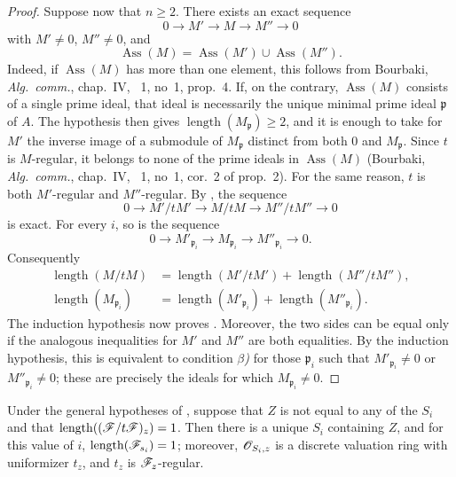 \begin{proof}
Suppose now that $n\geqslant 2$.
There exists an exact sequence
\[
0\longrightarrow M'\longrightarrow M\longrightarrow M''\longrightarrow 0
\]
with $M'\neq 0$, $M''\neq 0$, and
\[
\operatorname{Ass}(M)=\operatorname{Ass}(M')\cup\operatorname{Ass}(M'').
\]
Indeed, if $\operatorname{Ass}(M)$ has more than one element, this follows from Bourbaki, \emph{Alg.\ comm.}, chap.~IV, \textsection~1, no~1, prop.~4.
If, on the contrary, $\operatorname{Ass}(M)$ consists of a single prime ideal, that ideal is necessarily the unique minimal prime ideal $\mathfrak p$ of $A$.
The hypothesis then gives $\operatorname{length}(M_{\mathfrak p})\geqslant 2$, and it is enough to take for $M'$ the inverse image of a submodule of $M_{\mathfrak p}$ distinct from both $0$ and $M_{\mathfrak p}$.
Since $t$ is $M$-regular, it belongs to none of the prime ideals in $\operatorname{Ass}(M)$ (Bourbaki, \emph{Alg.\ comm.}, chap.~IV, \textsection~1, no~1, cor.~2 of prop.~2).
For the same reason, $t$ is both $M'$-regular and $M''$-regular.
By , the sequence
\[
0\longrightarrow M'/tM'
 \longrightarrow M/tM
 \longrightarrow M''/tM''
 \longrightarrow 0
\]
is exact.
For every $i$, so is the sequence
\[
0\longrightarrow M'_{\mathfrak p_i}
 \longrightarrow M_{\mathfrak p_i}
 \longrightarrow M''_{\mathfrak p_i}
 \longrightarrow 0.
\]
Consequently
\[
\begin{aligned}
\operatorname{length}(M/tM)
  &=
  \operatorname{length}(M'/tM')
  +
  \operatorname{length}(M''/tM''),\\
\operatorname{length}(M_{\mathfrak p_i})
  &=
  \operatorname{length}(M'_{\mathfrak p_i})
  +
  \operatorname{length}(M''_{\mathfrak p_i}).
\end{aligned}
\]
The induction hypothesis now proves .
Moreover, the two sides can be equal only if the analogous inequalities for $M'$ and $M''$ are both equalities.
By the induction hypothesis, this is equivalent to condition \emph{$\beta$)} for those $\mathfrak p_i$ such that $M'_{\mathfrak p_i}\neq 0$ or $M''_{\mathfrak p_i}\neq 0$; these are precisely the ideals for which $M_{\mathfrak p_i}\neq 0$.
\end{proof}


\begin{corollary}[3.4.2]
\label{IV.3.4.2}
Under the general hypotheses of , suppose that $Z$ is not equal to any of the $S_i$ and that $\operatorname{length}((\mathscr{F}/t\mathscr{F})_z)=1$.
Then there is a unique $S_i$ containing $Z$, and for this value of $i$, $\operatorname{length}(\mathscr{F}_{s_i})=1$; moreover, $\mathscr{O}_{S_i,z}$ is a discrete valuation ring with uniformizer $t_z$, and $t_z$ is $\mathscr{F}_z$-regular.
\end{corollary}

